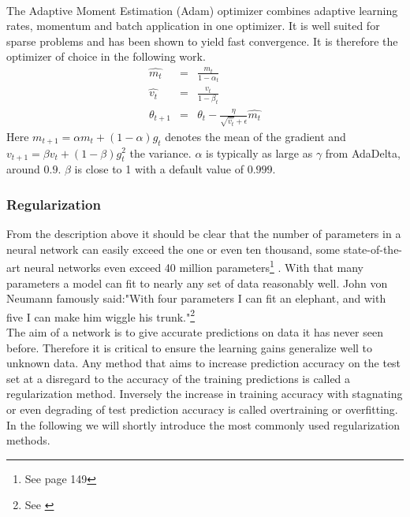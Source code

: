 				~\\
				The Adaptive Moment Estimation (Adam) optimizer combines adaptive learning rates, momentum and batch application in one optimizer. It is well suited for sparse problems and has been shown to yield fast convergence. It is therefore the optimizer of choice in the following work.
				\begin{eqnarray}
					\hat{m_t} & = & \frac{m_t}{1-\alpha_t}\\
					\hat{v_t} & = & \frac{v_t}{1-\beta_t} \\
					\theta_{t+1} & = & \theta_{t} - \frac{\eta}{\sqrt{\hat{v_t}}+\epsilon}\hat{m_t}
				\end{eqnarray}
				Here $m_{t+1} = \alpha m_t + (1-\alpha)g_t$ denotes the mean of the gradient and $v_{t+1} = \beta v_t + (1-\beta)g^2_t$ the variance. $\alpha$ is typically as large as $\gamma$ from AdaDelta, around $0.9$. $\beta$ is close to 1 with a default value of $0.999$. 
			\subsubsection{Regularization}
				From the description above it should be clear that the number of parameters in a neural network can easily exceed the one or even ten thousand, some state-of-the-art neural networks even exceed 40 million parameters\footnote{See \cite{BookMultimediaModeling} page 149} . With that many parameters a model can fit to nearly any set of data reasonably well. John von Neumann famously said:"With four parameters I can fit an elephant, and with five I can make him wiggle his trunk."\footnote{See \cite{NNElephant}}\\
				The aim of a network is to give accurate predictions on data it has never seen before. Therefore it is critical to ensure the learning gains generalize well to unknown data. Any method that aims to increase prediction accuracy on the test set at a disregard to the accuracy of the training predictions is called a regularization method. Inversely the increase in training accuracy with stagnating or even degrading of test prediction accuracy is called overtraining or overfitting.\\
				In the following we will shortly introduce the most commonly used regularization methods.
